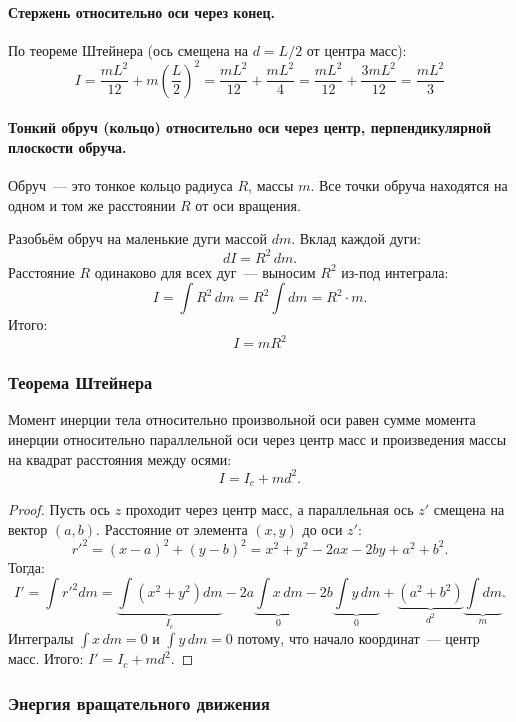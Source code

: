 \documentclass[12pt]{article}
\begin{document}
\paragraph{Стержень относительно оси через конец.}
По теореме Штейнера (ось смещена на $d = L/2$ от центра масс):
\[
	I = \frac{mL^2}{12} + m\left(\frac{L}{2}\right)^2 = \frac{mL^2}{12} + \frac{mL^2}{4} = \frac{mL^2}{12} + \frac{3mL^2}{12} = \boxed{\frac{mL^2}{3}}
\]

\paragraph{Тонкий обруч (кольцо) относительно оси через центр, перпендикулярной плоскости обруча.}

Обруч~--- это тонкое кольцо радиуса $R$, массы $m$. Все точки обруча находятся
на одном и том же расстоянии $R$ от оси вращения.

Разобьём обруч на маленькие дуги массой $dm$. Вклад каждой дуги:
\[
	dI = R^2\,dm.
\]
Расстояние $R$ одинаково для всех дуг~--- выносим $R^2$ из-под интеграла:
\[
	I = \int R^2\,dm = R^2 \int dm = R^2 \cdot m.
\]
Итого:
\[
	\boxed{I = mR^2}
\]

\subsubsection{Теорема Штейнера}

\begin{theorem}
	Момент инерции тела относительно произвольной оси равен сумме момента инерции относительно параллельной оси через центр масс и произведения массы на квадрат расстояния между осями:
	\[
		I = I_c + md^2.
	\]
\end{theorem}

\begin{proof}
	Пусть ось $z$ проходит через центр масс, а параллельная ось $z'$ смещена на вектор $(a, b)$. Расстояние от элемента $(x,y)$ до оси $z'$:
	\[
		r'^2 = (x - a)^2 + (y - b)^2 = x^2 + y^2 - 2ax - 2by + a^2 + b^2.
	\]
	Тогда:
	\[
		I' = \int r'^2 dm = \underbrace{\int(x^2+y^2)dm}_{I_c} - 2a\underbrace{\int x\,dm}_{0} - 2b\underbrace{\int y\,dm}_{0} + \underbrace{(a^2+b^2)}_{d^2}\underbrace{\int dm}_{m}.
	\]
	Интегралы $\int x\,dm = 0$ и $\int y\,dm = 0$ потому, что начало координат~--- центр масс. Итого: $I' = I_c + md^2$.
\end{proof}

\subsubsection{Энергия вращательного движения}
\end{document}
